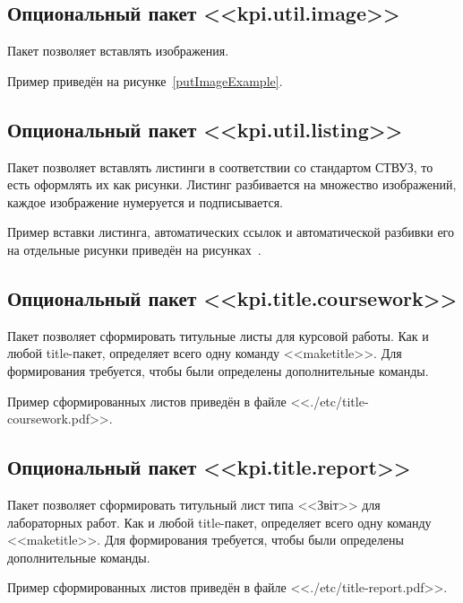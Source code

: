 \subsection{Опциональный пакет <<kpi.util.image>>}
	Пакет позволяет вставлять изображения.\par
	Пример приведён на рисунке~\ref{putImageExample}.
\subsection{Опциональный пакет <<kpi.util.listing>>}
	Пакет позволяет вставлять листинги в соответствии со стандартом СТВУЗ, то есть оформлять их как рисунки. Листинг разбивается на множество изображений, каждое изображение нумеруется и подписывается.\par
	Пример вставки листинга, автоматических ссылок и автоматической разбивки его на отдельные рисунки приведён на рисунках~.
\subsection{Опциональный пакет <<kpi.title.coursework>>}
	Пакет позволяет сформировать титульные листы для курсовой работы. Как и любой title-пакет, определяет всего одну команду <<maketitle>>. Для формирования требуется, чтобы были определены дополнительные команды.\par
	Пример сформированных листов приведён в файле <<./etc/title-coursework.pdf>>.
\subsection{Опциональный пакет <<kpi.title.report>>}
	Пакет позволяет сформировать титульный лист типа <<Звіт>> для лабораторных работ. Как и любой title-пакет, определяет всего одну команду <<maketitle>>. Для формирования требуется, чтобы были определены дополнительные команды.\par
	Пример сформированных листов приведён в файле <<./etc/title-report.pdf>>.